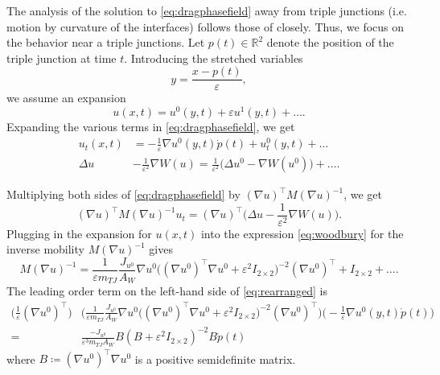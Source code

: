 \documentclass{article}
\theoremstyle{plain}
\theoremstyle{definition}
\theoremstyle{remark}
\newcommand{\R}{\mathbb{R}}
\newcommand{\eps}{\varepsilon}
\begin{document}
The analysis of the solution to \eqref{eq:dragphasefield} away from triple junctions (i.e. motion by curvature of the interfaces) follows those of \cite{RSK,bronsardreitich} closely. Thus, we focus on the behavior near a triple junctions. Let $p(t) \in \R^2$ denote the position of the triple junction at time $t$. Introducing the stretched variables
\begin{equation}
    y = \dfrac{x - p(t)}{\eps},
\end{equation}
we assume an expansion
\begin{equation}\label{eq:expansion}
    u(x,t) = u^0(y,t) + \eps u^1(y,t) +  \ldots.
\end{equation}
Expanding the various terms in \eqref{eq:dragphasefield}, we get
\begin{equation}\label{eq:asymptotic1}
\begin{split}
    u_t(x,t) &= -\frac{1}{\eps}\nabla u^0(y,t)\dot{p}(t) + u_t^0(y,t) + \ldots\\
    \Delta u &- \frac{1}{\eps^2}\nabla W(u) = \frac{1}{\eps^2}\bigg( \Delta u^0 - \nabla W(u^0) \bigg) + \ldots.
\end{split}
\end{equation}


Multiplying both sides of \eqref{eq:dragphasefield} by $(\nabla u)^\top M(\nabla u)^{-1}$, we get
\begin{equation}\label{eq:rearranged}
    (\nabla u)^\top M(\nabla u)^{-1} u_t = (\nabla u)^\top\bigg(\Delta u - \frac{1}{\eps^2} \nabla W(u)\bigg).
\end{equation}
Plugging in the expansion for $u(x,t)$ into the 
expression \eqref{eq:woodbury} for the inverse mobility $M(\nabla u)^{-1}$ gives
\begin{equation}\label{eq:asymptotic2}
    M(\nabla u)^{-1} = \frac{1}{\eps m_{TJ}}\frac{J_{u^0}}{A_W} \nabla u^0 \big( (\nabla u^0)^\top \nabla u^0 +\eps^2 I_{2\times 2}\big)^{-2}(\nabla u^0)^\top + I_{2\times 2} + \ldots.
\end{equation}
The leading order term on the left-hand side of \eqref{eq:rearranged} is
\begin{equation}\label{eq:LHSleading}
\begin{split}
    \bigg(\frac{1}{\eps}(\nabla u^0)^\top \bigg) & \bigg(\frac{1}{\eps m_{TJ}}\frac{J_{u^0}}{A_W} \nabla u^0 \big( (\nabla u^0)^\top \nabla u^0 +\eps^2 I_{2\times 2}\big)^{-2}(\nabla u^0)^\top\bigg)\bigg(-\frac{1}{\eps}\nabla u^0(y,t)\dot{p}(t)\bigg)\\
    = &\frac{-J_{u^0}}{\eps^3 m_{TJ}A_W}B (B + \eps^2 I_{2\times 2})^{-2}B \dot{p}(t)
\end{split}
\end{equation}
where $B \coloneqq (\nabla u^0)^\top \nabla u^0$ is a positive semidefinite matrix.
\end{document}
